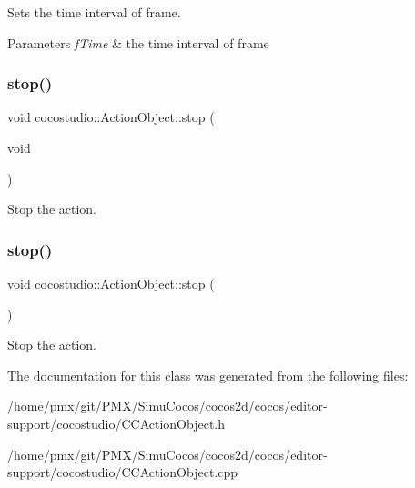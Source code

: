 Sets the time interval of frame.


\begin{DoxyParams}{Parameters}
{\em f\+Time} & the time interval of frame \\
\hline
\end{DoxyParams}
\mbox{\label{classcocostudio_1_1ActionObject_ad9616450d0b1c27499fc2ae17d1259be}} 
\subsubsection{\texorpdfstring{stop()}{stop()}\hspace{0.1cm}{\footnotesize\ttfamily [1/2]}}
{\footnotesize\ttfamily void cocostudio\+::\+Action\+Object\+::stop (\begin{DoxyParamCaption}\item[{void}]{ }\end{DoxyParamCaption})}

Stop the action. \mbox{\label{classcocostudio_1_1ActionObject_ad9616450d0b1c27499fc2ae17d1259be}} 
\subsubsection{\texorpdfstring{stop()}{stop()}\hspace{0.1cm}{\footnotesize\ttfamily [2/2]}}
{\footnotesize\ttfamily void cocostudio\+::\+Action\+Object\+::stop (\begin{DoxyParamCaption}{ }\end{DoxyParamCaption})}

Stop the action. 

The documentation for this class was generated from the following files\+:\begin{DoxyCompactItemize}
\item 
/home/pmx/git/\+P\+M\+X/\+Simu\+Cocos/cocos2d/cocos/editor-\/support/cocostudio/C\+C\+Action\+Object.\+h\item 
/home/pmx/git/\+P\+M\+X/\+Simu\+Cocos/cocos2d/cocos/editor-\/support/cocostudio/C\+C\+Action\+Object.\+cpp\end{DoxyCompactItemize}

